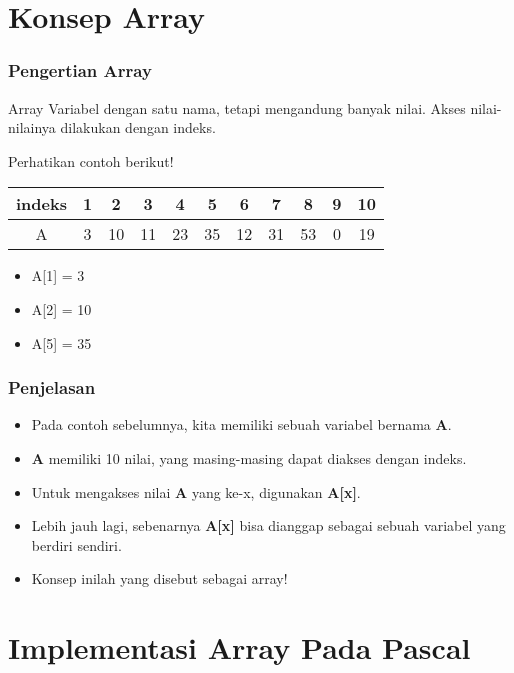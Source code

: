 \documentclass{beamer}
\begin{document}
\section{Konsep Array}
\frame{\sectionpage}

\begin{frame}
\frametitle{Pengertian Array}
\begin{block}{Array}
Variabel dengan satu nama, tetapi mengandung banyak nilai.
Akses nilai-nilainya dilakukan dengan indeks.
\end{block}
\vfill
Perhatikan contoh berikut!
\vfill
\begin{tabular}{|c|c|c|c|c|c|c|c|c|c|c|}
\hline indeks & 1 & 2 & 3 & 4 & 5 & 6 & 7 & 8 & 9 & 10 \\ 
\hline A & 3 & 10 & 11 & 23 & 35 & 12 & 31 & 53 & 0 & 19 \\ 
\hline 
\end{tabular} 

\begin{itemize}
	\item A[1] = 3
	\item A[2] = 10
	\item A[5] = 35
\end{itemize}
\end{frame}

\begin{frame}
\frametitle{Penjelasan}
\begin{itemize}
	\item Pada contoh sebelumnya, kita memiliki sebuah variabel bernama \textbf{A}.
	\item \textbf{A} memiliki 10 nilai, yang masing-masing dapat diakses dengan indeks.
	\item Untuk mengakses nilai \textbf{A} yang ke-x, digunakan \textbf{A[x]}.
	\item Lebih jauh lagi, sebenarnya \textbf{A[x]} bisa dianggap sebagai sebuah variabel yang berdiri sendiri.
	\item Konsep inilah yang disebut sebagai array!
\end{itemize}
\end{frame}

\section{Implementasi Array Pada Pascal}
\frame{\sectionpage}
\end{document}
